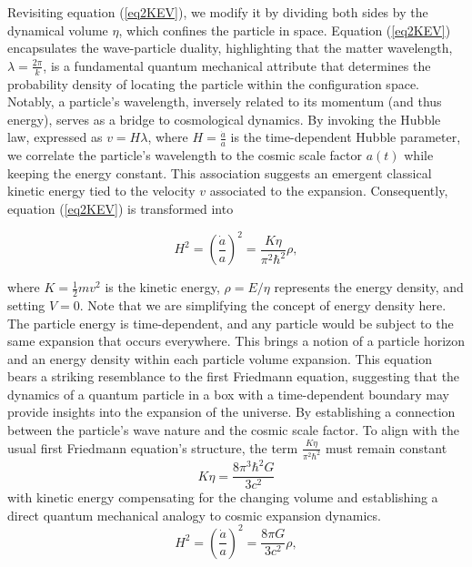 \documentclass{article}
\begin{document}
Revisiting equation (\ref{eq2KEV}), we modify it by dividing both sides by the dynamical volume $\eta$, which confines the particle in space. Equation (\ref{eq2KEV}) encapsulates the wave-particle duality, highlighting that the matter wavelength, $\lambda = \frac{2 \pi}{k}$, is a fundamental quantum mechanical attribute that determines the probability density of locating the particle within the configuration space. Notably, a particle's wavelength, inversely related to its momentum (and thus energy), serves as a bridge to cosmological dynamics. By invoking the Hubble law, expressed as $v = H \lambda$, where $H = \frac{\dot{a}}{a}$ is the time-dependent Hubble parameter, we correlate the particle's wavelength to the cosmic scale factor $a(t)$ while keeping the energy constant. This association suggests an emergent classical kinetic energy tied to the velocity $v$ associated to the expansion. Consequently, equation (\ref{eq2KEV}) is transformed into

\begin{equation}
H^2 = \left( \frac{\dot{a}}{a} \right)^2 = \frac{K\eta}{\pi^2 \hbar^2} \rho, \label{eq:Friedmann1fromQuantum}
\end{equation}

where $K=\frac{1}{2}mv^{2}$ is the kinetic energy, $\rho=E/\eta$ represents the energy density, and setting $V=0$. Note that we are simplifying the concept of energy density here. The particle energy is time-dependent, and any particle would be subject to the same expansion that occurs everywhere. This brings a notion of a particle horizon and an energy density within each particle volume expansion. This equation bears a striking resemblance to the first Friedmann equation, suggesting that the dynamics of a quantum particle in a box with a time-dependent boundary may provide insights into the expansion of the universe. By establishing a connection between the particle's wave nature and the cosmic scale factor.
To align with the usual first Friedmann equation's structure, the term $\frac{K\eta}{\pi^2 \hbar^2}$ must remain constant
\begin{equation}
K\eta=\frac{8\pi^{3}\hbar^{2}G}{3c^{2}} \label{kineticvolumeconstar}
\end{equation}
with kinetic energy compensating for the changing volume and establishing a direct quantum mechanical analogy to cosmic expansion dynamics.
\begin{equation}
H^2 = \left( \frac{\dot{a}}{a} \right)^2 = \frac{8\pi G}{3c^{2}} \rho, \label{eq:Friedmann1fromQuantum2}
\end{equation}
\end{document}
